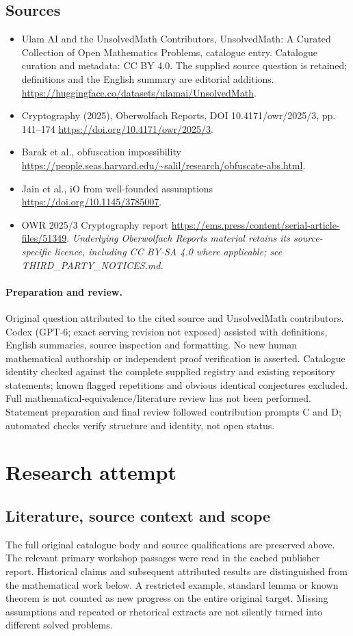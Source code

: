 \documentclass[11pt]{article}
\begin{document}
\subsection{Sources}
\begin{itemize}
\item[S1] Ulam AI and the UnsolvedMath Contributors, UnsolvedMath: A Curated Collection of Open Mathematics Problems, catalogue entry. Catalogue curation and metadata: CC BY 4.0. The supplied source question is retained; definitions and the English summary are editorial additions.
\url{https://huggingface.co/datasets/ulamai/UnsolvedMath}.
\item[S2] Cryptography (2025), Oberwolfach Reports, DOI 10.4171/owr/2025/3, pp. 141--174
\url{https://doi.org/10.4171/owr/2025/3}.
\item[S3] Barak et al., obfuscation impossibility
\url{https://people.seas.harvard.edu/~salil/research/obfuscate-abs.html}.
\item[S4] Jain et al., iO from well-founded assumptions
\url{https://doi.org/10.1145/3785007}.
\item[S5] OWR 2025/3 Cryptography report
\url{https://ems.press/content/serial-article-files/51349}.
\textit{Underlying Oberwolfach Reports material retains its source-specific licence, including CC BY-SA 4.0 where applicable; see THIRD\_PARTY\_NOTICES.md.}
\end{itemize}
\paragraph{Preparation and review.}
Original question attributed to the cited source and UnsolvedMath contributors. Codex (GPT-6; exact serving revision not exposed) assisted with definitions, English summaries, source inspection and formatting. No new human mathematical authorship or independent proof verification is asserted. Catalogue identity checked against the complete supplied registry and existing repository statements; known flagged repetitions and obvious identical conjectures excluded. Full mathematical-equivalence/literature review has not been performed. Statement preparation and final review followed contribution prompts C and D; automated checks verify structure and identity, not open status.
\label{end:statement}

\section{Research attempt}
\subsection{Literature, source context and scope}
The full original catalogue body and source qualifications are preserved above. The relevant primary workshop passages were read in the cached publisher report. Historical claims and subsequent attributed results are distinguished from the mathematical work below. A restricted example, standard lemma or known theorem is not counted as new progress on the entire original target. Missing assumptions and repeated or rhetorical extracts are not silently turned into different solved problems.
\end{document}
